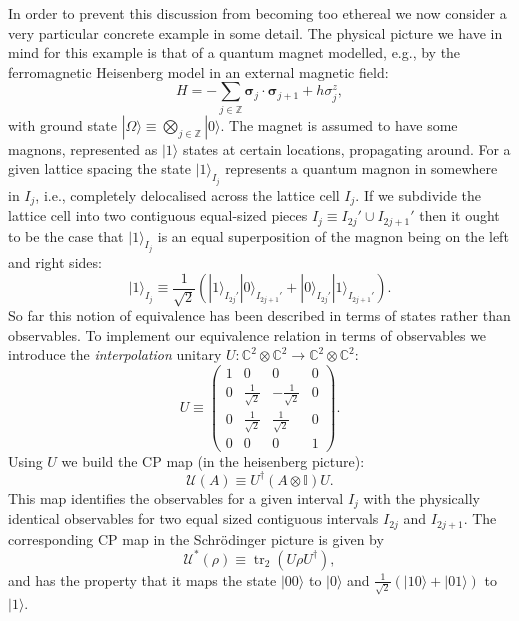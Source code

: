 \documentclass[11pt]{amsart}
\DeclareMathOperator{\tr}{tr}
\theoremstyle{plain}%
\theoremstyle{definition}
\theoremstyle{remark}
\begin{document}
In order to prevent this discussion from becoming too ethereal we now consider a very particular concrete example in some detail. The physical picture we have in mind for this example is that of a quantum magnet modelled, e.g., by the ferromagnetic Heisenberg model in an external magnetic field:
\begin{equation}
	H = -\sum_{j\in\mathbb{Z}} \boldsymbol{\sigma}_j\cdot\boldsymbol{\sigma}_{j+1} + h\sigma^z_j,
\end{equation}
with ground state $|\Omega\rangle \equiv \bigotimes_{j\in\mathbb{Z}} |0\rangle$. The magnet is assumed to have some magnons, represented as $|1\rangle$ states at certain locations, propagating around. For a given lattice spacing the state $|1\rangle_{I_j}$ represents a quantum magnon in somewhere in $I_j$, i.e., completely delocalised across the lattice cell $I_j$. If we subdivide the lattice cell into two contiguous equal-sized pieces $I_j \equiv I_{2j}'\cup I_{2j+1}'$ then it ought to be the case that $|1\rangle_{I_j}$ is an equal superposition of the magnon being on the left and right sides:
\begin{equation}
	|1\rangle_{I_j} \equiv \frac{1}{\sqrt{2}} \left(|1\rangle_{I_{2j}'}|0\rangle_{I_{2j+1}'}+|0\rangle_{I_{2j}'}|1\rangle_{I_{2j+1}'}\right).
\end{equation}
So far this notion of equivalence has been described in terms of states rather than observables. To implement our equivalence relation in terms of observables we introduce the \emph{interpolation} unitary $U:\mathbb{C}^2\otimes \mathbb{C}^2\rightarrow \mathbb{C}^2\otimes \mathbb{C}^2$:
\begin{equation}
	U \equiv \begin{pmatrix} 1 & 0 & 0 & 0 \\ 0 & \frac{1}{\sqrt{2}} & -\frac{1}{\sqrt{2}} & 0 \\ 0 & \frac{1}{\sqrt{2}} & \frac{1}{\sqrt{2}} & 0 \\ 0 & 0 & 0 & 1\end{pmatrix}.
\end{equation}
Using $U$ we build the CP map (in the heisenberg picture):
\begin{equation}
	\mathcal{U}(A) \equiv U^\dag (A\otimes \mathbb{I}) U.
\end{equation}
This map identifies the observables for a given interval $I_j$ with the physically identical observables for two equal sized contiguous intervals $I_{2j}$ and $I_{2j+1}$. The corresponding CP map in the Schr\"odinger picture is given by
\begin{equation}
	\mathcal{U}^{*}(\rho) \equiv \tr_2( U \rho U^\dag),
\end{equation}
and has the property that it maps the state $|00\rangle$ to $|0\rangle$ and $\frac{1}{\sqrt{2}} \left(|10\rangle+|01\rangle\right)$ to $|1\rangle$. 
\end{document}
